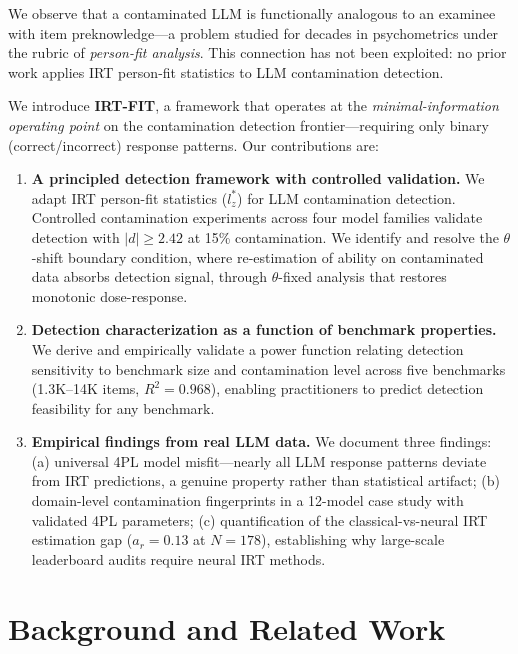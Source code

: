 \documentclass[11pt,a4paper]{article}
\newcommand{\lzstar}{$l_{z}^{*}$}
\newcommand{\thetafix}{$\theta$-fixed}
\begin{document}
We observe that a contaminated LLM is functionally analogous to an examinee with item preknowledge---a problem studied for decades in psychometrics under the rubric of \emph{person-fit analysis}.
This connection has not been exploited: no prior work applies IRT person-fit statistics to LLM contamination detection.

We introduce \textbf{IRT-FIT}, a framework that operates at the \emph{minimal-information operating point} on the contamination detection frontier---requiring only binary (correct/incorrect) response patterns.
Our contributions are:

\begin{enumerate}
\item \textbf{A principled detection framework with controlled validation.}
We adapt IRT person-fit statistics (\lzstar) for LLM contamination detection. Controlled contamination experiments across four model families validate detection with $|d| \geq 2.42$ at 15\% contamination. We identify and resolve the $\theta$-shift boundary condition, where re-estimation of ability on contaminated data absorbs detection signal, through \thetafix{} analysis that restores monotonic dose-response.

\item \textbf{Detection characterization as a function of benchmark properties.}
We derive and empirically validate a power function relating detection sensitivity to benchmark size and contamination level across five benchmarks (1.3K--14K items, $R^2 = 0.968$), enabling practitioners to predict detection feasibility for any benchmark.

\item \textbf{Empirical findings from real LLM data.}
We document three findings: (a) universal 4PL model misfit---nearly all LLM response patterns deviate from IRT predictions, a genuine property rather than statistical artifact; (b) domain-level contamination fingerprints in a 12-model case study with validated 4PL parameters; (c) quantification of the classical-vs-neural IRT estimation gap ($a_r = 0.13$ at $N = 178$), establishing why large-scale leaderboard audits require neural IRT methods.
\end{enumerate}

\section{Background and Related Work}
\label{sec:background}
\end{document}

